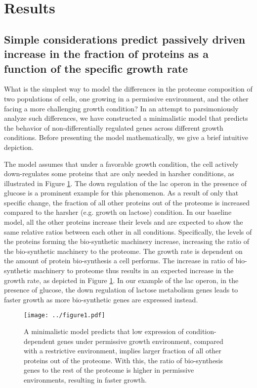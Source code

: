 \documentclass{article}
\begin{document}
\section{Results}

\subsection{Simple considerations predict passively driven increase in the fraction of proteins as a function of the specific growth rate}
What is the simplest way to model the differences in the proteome composition of two populations of cells, one growing in a permissive environment, and the other facing a more challenging growth condition?
In an attempt to parsimoniously analyze such differences, we have constructed a minimalistic model that predicts the behavior of non-differentially regulated genes across different growth conditions.
Before presenting the model mathematically, we give a brief intuitive depiction.

The model assumes that under a favorable growth condition, the cell actively down-regulates some proteins that are only needed in harsher conditions, as illustrated in Figure \ref{fig:model}.
The down regulation of the lac operon in the presence of glucose is a prominent example for this phenomenon. 
As a result of only that specific change, the fraction of all other proteins out of the proteome is increased compared to the harsher (e.g. growth on lactose) condition.
In our baseline model, all the other proteins increase their levels and are expected to show the same relative ratios between each other in all conditions. 
Specifically, the levels of the proteins forming the bio-synthetic machinery increase, increasing the ratio of the bio-synthetic machinery to the proteome.
The growth rate is dependent on the amount of protein bio-synthesis a cell performs.
The increase in ratio of bio-synthetic machinery to proteome thus results in an expected increase in the growth rate, as  depicted in Figure \ref{fig:model}.
In our example of the lac operon, in the presence of glucose, the down regulation of lactose metabolism genes leads to faster growth as more bio-synthetic genes are expressed instead.

\begin{figure}[H]
\begin{center}
\texttt{[image: ../figure1.pdf]}
\caption{\label{fig:model}
A minimalistic model predicts that low expression of condition-dependent genes under permissive growth environment, compared with a restrictive environment, implies larger fraction of all other proteins out of the proteome.
With this, the ratio of bio-synthesis genes to the rest of the proteome is higher in permissive environments, resulting in faster growth.
%
}
\end{center}
\end{figure}
\end{document}
